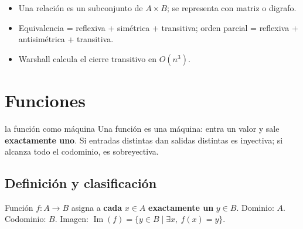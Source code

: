 
\begin{tmresumen}
\begin{itemize}
\item Una relaci\'on es un subconjunto de $A\times B$; se representa con matriz o digrafo.
\item Equivalencia = reflexiva + sim\'etrica + transitiva; orden parcial = reflexiva + antisim\'etrica + transitiva.
\item Warshall calcula el cierre transitivo en $O(n^3)$.
\end{itemize}
\end{tmresumen}

\section{Funciones}
\label{sec:1-4}

\begin{tmconcepto}{la funci\'on como m\'aquina}
Una funci\'on es una m\'aquina: entra un valor y sale \textbf{exactamente uno}. Si entradas distintas dan salidas distintas es inyectiva; si alcanza todo el codominio, es sobreyectiva.
\end{tmconcepto}


\subsection{Definici\'on y clasificaci\'on}
\begin{tmdef}{Funci\'on}
$f:A\to B$ asigna a \textbf{cada} $x\in A$ \textbf{exactamente un} $y\in B$. Dominio: $A$. Codominio: $B$. Imagen: $\operatorname{Im}(f)=\{y\in B\mid\exists x,\ f(x)=y\}$.
\end{tmdef}

